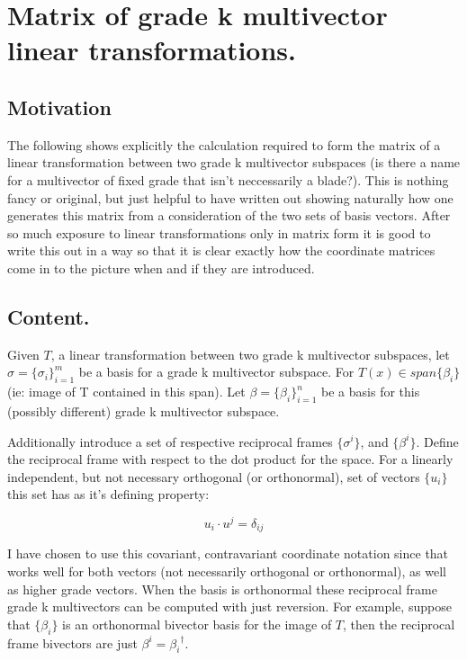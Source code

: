 \chapter{Matrix of grade k multivector linear transformations.}
\label{chap:matrixOfLinearTx}

\date{ May 16, 2008.  $RCSfile: matrixOfLinearTx.tex,v $ Last $Revision: 1.8 $ $Date: 2009/06/14 17:59:59 $ }

\section{Motivation }

The following shows explicitly the calculation required to form the matrix of a linear transformation between two grade k multivector subspaces (is there a name for a multivector of fixed grade that isn't neccessarily a blade?).
This is nothing fancy or original, but just helpful
to have written out showing naturally how one generates this matrix from a consideration of the two sets of basis vectors.  After so much exposure to linear transformations only in matrix
form it is good to write this out in a way so that it is clear exactly how the coordinate matrices come in to the picture when and if they are introduced.

\section{Content. }

Given $T$, a linear transformation between two grade k multivector subspaces,
let $\sigma = \{\sigma_i\}_{i=1}^m$ be a basis for a grade k multivector subspace.
For $T(x) \in span\{ \beta_i \}$ (ie: image of T contained in this span).  Let $\beta = \{\beta_i\}_{i=1}^n$ be a basis for this (possibly different) grade k multivector subspace.

Additionally introduce a set of respective reciprocal frames $\{\sigma^i\}$, and $\{\beta^i\}$.
Define the reciprocal frame with respect to the dot product for the space.  For a linearly independent, but not necessary orthogonal (or orthonormal), set of vectors $\{u_i\}$ this set 
has as it's defining property:

\[
u_i \cdot u^j = \delta_{ij}
\]

I have chosen to use this covariant, contravariant coordinate notation since that works well for both vectors (not necessarily orthogonal or orthonormal), as well as higher grade vectors.  When the basis is orthonormal these reciprocal frame grade k multivectors can be computed with just reversion.  For example, suppose that $\{\beta_i\}$ is an orthonormal bivector basis for the image of $T$, then the reciprocal frame bivectors are just $\beta^i = {\beta_i}^\dagger$.

